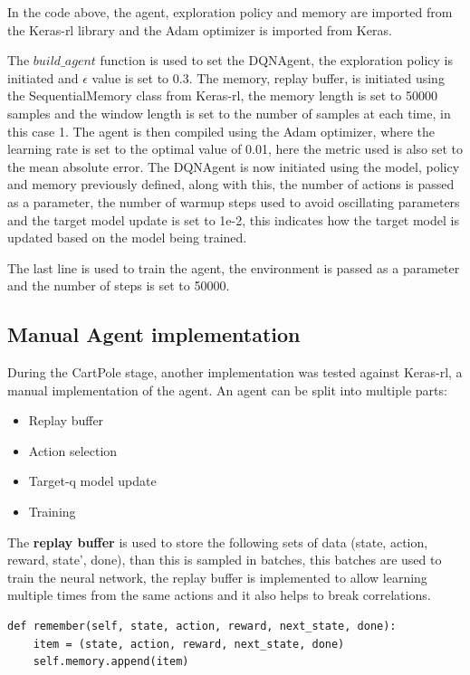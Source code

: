 In the code above, the agent, exploration policy and memory are imported from the Keras-rl library and the Adam optimizer is imported from Keras.

The $build\_agent$ function is used to set the DQNAgent, the exploration policy is initiated and $\epsilon$ value is set to 0.3.
The memory, replay buffer, is initiated using the SequentialMemory class from Keras-rl, the memory length is set to 50000 samples and the window length is set to the number of samples at each time, in this case 1.
The agent is then compiled using the Adam optimizer, where the learning rate is set to the optimal value of 0.01, here the metric used is also set to the mean absolute error.
The DQNAgent is now initiated using the model, policy and memory previously defined, along with this, the number of actions is passed as a parameter, the number of warmup steps used to avoid oscillating parameters and the target model update is set to 1e-2, this indicates how the target model is updated based on the model being trained.

The last line is used to train the agent, the environment is passed as a parameter and the number of steps is set to 50000.

\subsection*{Manual Agent implementation}
During the CartPole stage, another implementation was tested against Keras-rl, a manual implementation of the agent.
An agent can be split into multiple parts:
\begin{itemize}
    \item Replay buffer
    \item Action selection
    \item Target-q model update
    \item Training
\end{itemize}

The \textbf{replay buffer} is used to store the following sets of data (state, action, reward, state', done), than this is sampled in batches, this batches are used to train the neural network, the replay buffer is implemented to allow learning multiple times from the same actions and it also helps to break correlations.
\lstset{language=Python}
\lstset{frame=lines}
\lstset{basicstyle=\footnotesize}
\begin{lstlisting}
def remember(self, state, action, reward, next_state, done):
    item = (state, action, reward, next_state, done)
    self.memory.append(item)
\end{lstlisting}



